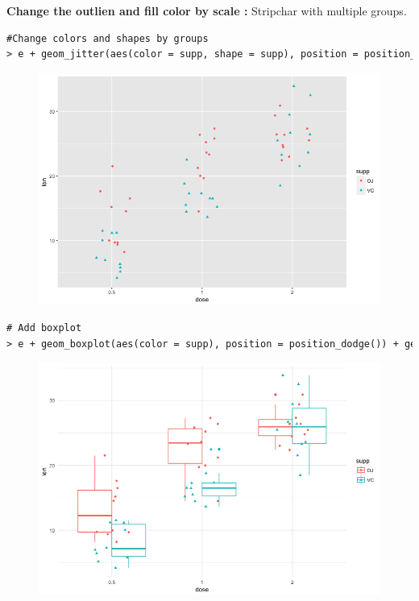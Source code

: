 \textbf{Change the outlien and fill color by scale : } Stripchar with multiple groups.
\begin{lstlisting}[language=html]
#Change colors and shapes by groups
> e + geom_jitter(aes(color = supp, shape = supp), position = position_jitter(0.2))
\end{lstlisting}
\begin{figure}[H]\begin{center}\includegraphics[scale=1 ]{ilu/bg117.png}\end{center}\end{figure}
\begin{lstlisting}[language=html]
# Add boxplot
> e + geom_boxplot(aes(color = supp), position = position_dodge()) + geom_jitter(aes(color = supp, shape = supp), position = position_jitter(0.2)) + theme_minimal()
\end{lstlisting}
\begin{figure}[H]\begin{center}\includegraphics[scale=1 ]{ilu/bg118.png}\end{center}\end{figure}



